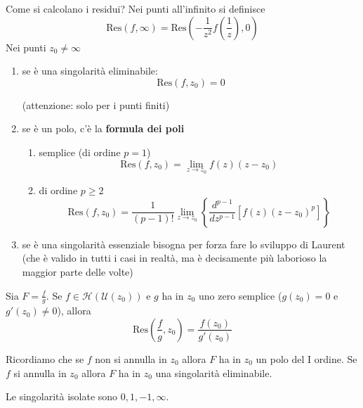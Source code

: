 \begin{rem}
Come si calcolano i residui?
Nei punti all'infinito si definisce
\begin{equation*}
\mathrm{Res}\left( f,\infty \right) =\mathrm{Res}\left( -\frac{1}{z^{2}} f\left(\frac{1}{z}\right) ,0\right)
\end{equation*}
Nei punti $z_{0} \neq \infty $
\begin{enumerate}
\item se è una singolarità eliminabile:\begin{equation*}
\mathrm{Res}\left( f,z_{0}\right) =0
\end{equation*}

(attenzione: solo per i punti finiti)
\item se è un polo, c'è la \textbf{formula dei poli}
\begin{enumerate}
\item semplice (di ordine $p=1$)\begin{equation*}
\mathrm{Res}\left( f,z_{0}\right) =\lim\limits _{z\rightarrow z_{0}} f\left( z\right)\left( z-z_{0}\right)
\end{equation*}
\item di ordine $p\geqslant 2$\begin{equation*}
\mathrm{Res}\left( f,z_{0}\right) =\frac{1}{\left( p-1\right) !}\lim\limits _{z\rightarrow z_{0}}\left\{\frac{d^{p-1}}{dz^{p-1}}\left[ f\left( z\right)\left( z-z_{0}\right)^{p}\right]\right\}
\end{equation*}
\end{enumerate}
\item se è una singolarità essenziale bisogna per forza fare lo sviluppo di Laurent (che è valido in tutti i casi in realtà, ma è decisamente più laborioso la maggior parte delle volte)
\end{enumerate}
\end{rem}
\begin{thm}
Sia $F=\frac{f}{g}$. Se $f\in \mathcal{H}\left(\mathcal{U}\left( z_{0}\right)\right)$ e $g$ ha in $z_{0}$ uno zero semplice ($g\left( z_{0}\right) =0$ e $g'\left( z_{0}\right) \neq 0$), allora\begin{equation*}
\mathrm{Res}\left(\frac{f}{g} ,z_{0}\right) =\frac{f\left( z_{0}\right)}{g'\left( z_{0}\right)}
\end{equation*}

Ricordiamo che se $f$ non si annulla in $z_{0}$ allora $F$ ha in $z_{0}$ un polo del I ordine. Se $f$ si annulla in $z_{0}$ allora $F$ ha in $z_{0}$ una singolarità eliminabile.
\end{thm}
Le singolarità isolate sono $0,1,-1,\infty $.

